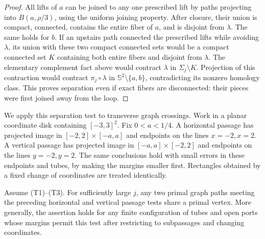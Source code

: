 \begin{proof}
All lifts of $a$ can be joined to any one prescribed lift by paths
projecting into $B(a,\rho/3)$, using the uniform joining property.
After closure, their union is compact, connected, contains the
entire fiber of $a$, and is disjoint from $\lambda$. The same holds
for $b$. If an upstairs path connected the prescribed lifts while
avoiding $\lambda$, its union with these two compact connected sets
would be a compact connected set $K$ containing both entire fibers
and disjoint from $\lambda$. The elementary complement fact above
would contract $\lambda$ in $\Sigma_j\setminus K$. Projection of
this contraction would contract $\pi_j\circ\lambda$ in
$\mathbb S^2\setminus\{a,b\}$, contradicting its nonzero homology
class. This proves separation even if exact fibers are disconnected:
their pieces were first joined away from the loop.
\end{proof}

We apply this separation test to transverse graph crossings.
Work in a planar coordinate disk containing $[-3,3]^2$.
Fix $0<a<1/4$. A horizontal passage has projected image in
$[-2,2]\times[-a,a]$ and endpoints on the lines $x=-2,x=2$.
A vertical passage has projected image in
$[-a,a]\times[-2,2]$ and endpoints on the lines $y=-2,y=2$.
The same conclusions hold with small errors in these endpoints and
tubes, by making the margins smaller first. Rectangles obtained by
a fixed change of coordinates are treated identically.

\begin{corollary}
\label{bg:primal-crossing}
Assume (T1)--(T3). For sufficiently large $j$, any two primal graph
paths meeting the preceding horizontal and vertical passage tests share
a primal vertex. More generally, the assertion holds for any finite
configuration of tubes and open ports whose margins permit this
test after restricting to subpassages and changing coordinates.
\end{corollary}

